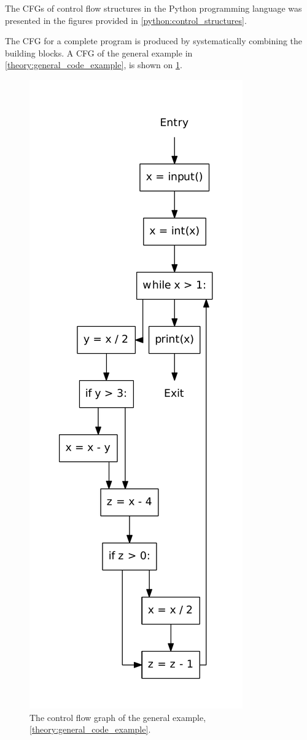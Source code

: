 The CFGs of control flow structures in the Python programming language was presented in the figures provided in \cref{python:control_structures}.

The CFG for a complete program is produced by systematically combining the building blocks.
A CFG of the general example in \cref{theory:general_code_example}, is shown on \cref{theory:general_code_example_cfg}.

\begin{figure}
  \center
  \includegraphics[width=.25\textwidth]{figures/general_example.pdf}
  \caption{The control flow graph of the general example, \cref{theory:general_code_example}.}
  \label{theory:general_code_example_cfg}
\end{figure}
